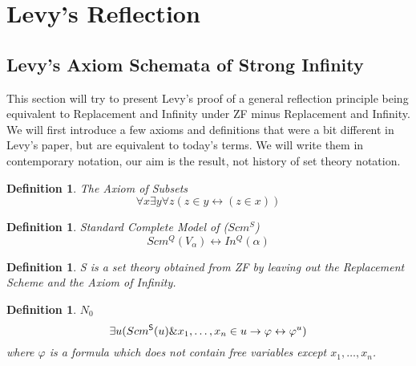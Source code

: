 \documentclass[12pt,a4paper]{article}
\newtheorem{definition}[theorem]{Definition}
\renewcommand{\iff}{\leftrightarrow}
\newcommand{\then}{\rightarrow}
\begin{document}

% 


\newpage
\section{Levy's Reflection}\label{sec:fixed}

\subsection{Levy's Axiom Schemata of Strong Infinity}\label{sec:Levy1960}
This section will try to present Levy's proof of a general reflection principle being equivalent to Replacement and Infinity under ZF minus Replacement and Infinity.
We will first introduce a few axioms and definitions that were a bit different in Levy's paper\cite{Levy60a}, but are equivalent to today's terms. We will write them in contemporary notation, our aim is the result, not history of set theory notation.

\begin{definition}{The Axiom of Subsets}\label{def:subsets_axiom}
\begin{equation}
\forall x \exists y \forall z (z \in y \iff (z \in x ))
\end{equation}
\end{definition}

\begin{definition}{Standard Complete Model of ($Scm^S$)}\label{def:scm_a}
\begin{equation}
Scm^{Q}(V_\alpha) \iff In^{Q}(\alpha)
\end{equation}
\end{definition}

\begin{definition}{}\label{def:set_theory_s}
S is a set theory obtained from ZF by leaving out the Replacement Scheme and the Axiom of Infinity.
\end{definition}

\begin{definition}{$N_0$}
\begin{equation}
\exists u (Scm^{\sf{S}}(u) \& x_1, \ldots , x_n \in u \then \varphi \iff \varphi^{u})
\end{equation}
where $\varphi$ is a formula which does not contain free variables except $x_1, \ldots , x_n$.
\end{definition}
\end{document}
